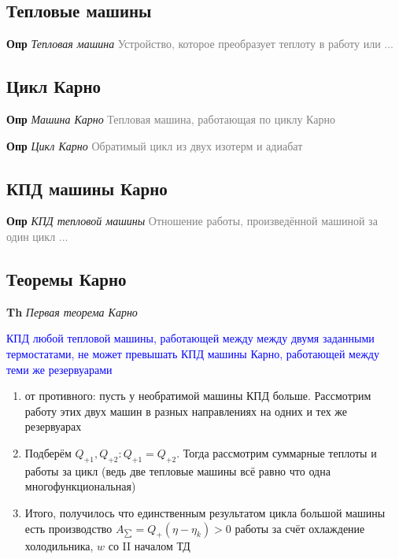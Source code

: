 \documentclass[a4paper, 14pt]{article}
\begin{document}
    \subsection{Тепловые машины}
    
    \textbf{Опр} \textit{Тепловая машина} \textcolor{gray}{Устройство, которое преобразует теплоту в работу или ...}
    
    \subsection{Цикл Карно}
    
    \textbf{Опр} \textit{Машина Карно} \textcolor{gray}{Тепловая машина, работающая по циклу Карно}
    
    \textbf{Опр} \textit{Цикл Карно} \textcolor{gray}{Обратимый цикл из двух изотерм и адиабат}
    
    \subsection{КПД машины Карно}
    
    \textbf{Опр} \textit{КПД тепловой машины} \textcolor{gray}{Отношение работы, произведённой машиной за один цикл ...}
    
    \subsection{Теоремы Карно}
    
    \textbf{Th} \textit{Первая теорема Карно}
    
    \textcolor{blue}{КПД любой тепловой машины, работающей между между двумя заданными термостатами, не может
    превышать КПД машины Карно, работающей между теми же резервуарами}
    
    \begin{enumerate}
        \item от противного: пусть у необратимой машины КПД больше.
        Рассмотрим работу этих двух машин в разных направлениях на одних и тех же резервуарах
        \item Подберём $Q_{+1}, Q_{+2}: Q_{+1} = Q_{+2}$.
        Тогда рассмотрим суммарные теплоты и работы за цикл (ведь две тепловые машины всё равно что одна
        многофункциональная)
        \item Итого, получилось что единственным результатом цикла большой машины есть производство $A_{\sum} = Q_+
        (\eta - \eta_k) > 0$ работы за счёт охлаждение холодильника, $w$ со II началом ТД
    \end{enumerate}
    
\end{document}
